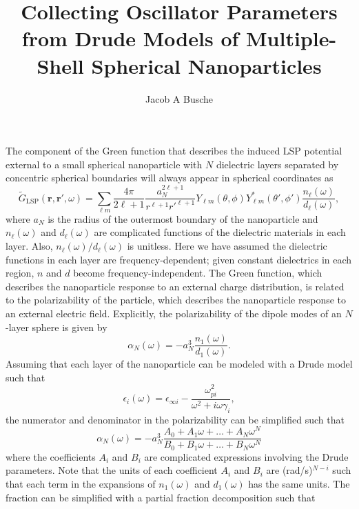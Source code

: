 \documentclass{article}
\renewcommand{\b}[1]{
	\mathbf{#1}
}
\renewcommand{\tilde}[1]{
	\widetilde{#1}
}
\begin{document}
\title{Collecting Oscillator Parameters from Drude Models of Multiple-Shell Spherical Nanoparticles}
\author{Jacob A Busche}
\maketitle

The component of the Green function that describes the induced LSP potential external to a small spherical nanoparticle with $N$ dielectric layers separated by concentric spherical boundaries will always appear in spherical coordinates as
\begin{equation}
\tilde{G}_\text{LSP}(\b{r},\b{r}',\omega) = \sum_{\ell m}\frac{4\pi}{2\ell+1}\frac{a_N^{2\ell+1}}{r^{\ell+1}r'^{\ell+1}}Y_{\ell m}(\theta,\phi)Y_{\ell m}^*(\theta',\phi')\frac{n_\ell(\omega)}{d_\ell(\omega)},
\end{equation}
where $a_N$ is the radius of the outermost boundary of the nanoparticle and $n_\ell(\omega)$ and $d_\ell(\omega)$ are complicated functions of the dielectric materials in each layer. Also, $n_\ell(\omega)/d_\ell(\omega)$ is unitless. Here we have assumed the dielectric functions in each layer are frequency-dependent; given constant dielectrics in each region, $n$ and $d$ become frequency-independent. The Green function, which describes the nanoparticle response to an external charge distribution, is related to the polarizability of the particle, which describes the nanoparticle response to an external electric field. Explicitly, the polarizability of the dipole modes of an $N$-layer sphere is given by
\begin{equation}
\alpha_N(\omega) = -a_N^3\frac{n_1(\omega)}{d_1(\omega)}.
\end{equation}
Assuming that each layer of the nanoparticle can be modeled with a Drude model such that
\begin{equation}
\epsilon_i(\omega) = \epsilon_{\infty i} - \frac{\omega_{pi}^2}{\omega^2 + i\omega\gamma_i},
\end{equation}
the numerator and denominator in the polarizability can be simplified such that
\begin{equation}
\alpha_N(\omega) = -a_N^3\frac{A_0 + A_1\omega + \ldots + A_N\omega^N}{B_0 + B_1\omega + \ldots + B_N\omega^N}
\end{equation}
where the coefficients $A_i$ and $B_i$ are complicated expressions involving the Drude parameters. Note that the units of each coefficient $A_i$ and $B_i$ are (rad/s)$^{N-i}$ such that each term in the expansions of $n_1(\omega)$ and $d_1(\omega)$ has the same units. The fraction can be simplified with a partial fraction decomposition such that
\end{document}
